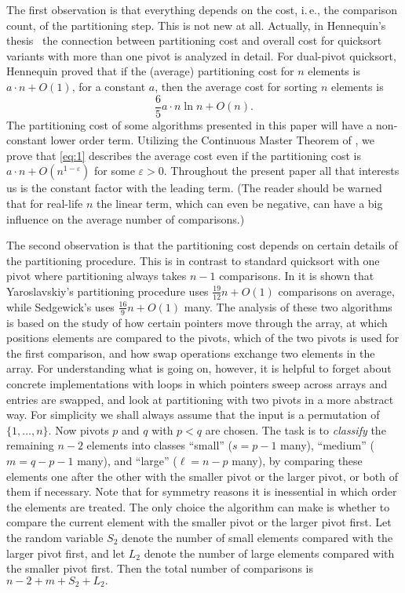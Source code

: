 \documentclass[prodmode,acmtalg]{acmsmall}
\begin{document}
The first observation is that everything depends on the cost, i.\,e., the comparison count, of the partitioning
step.
This is not new at all. Actually, in Hennequin's thesis~\cite{hennequin}
the connection between partitioning cost and overall cost 
for quicksort variants with more than one pivot is analyzed in detail.
For dual-pivot quicksort, Hennequin proved that 
if the (average) partitioning cost for $n$ elements is $a\cdot n+O(1)$, for a constant $a$, then the average cost for sorting $n$ elements is 
\begin{equation}\label{eq:1}
    \frac65a\cdot n\ln n + O(n).
\end{equation}
The partitioning cost of some algorithms presented in this paper will have a non-constant lower order term.
Utilizing the Continuous Master Theorem of \cite{Roura01},
we prove that \eqref{eq:1} describes the average cost even if the partitioning cost is $a \cdot n + O(n^{1-\varepsilon})$ for 
some $\varepsilon > 0$.
Throughout the present paper all that interests us is the constant factor with the leading term.
(The reader should be warned that for real-life $n$ the linear term,
which can even be negative, can have a big influence
on the average number of comparisons.)

The second observation is that the partitioning cost depends on certain details of the 
partitioning procedure. This is in contrast to standard quicksort with one pivot
where partitioning always takes $n-1$ comparisons. In \cite{nebel12} it is shown
that Yaroslavskiy's partitioning procedure uses $\frac{19}{12}n + O(1)$ comparisons on average,
while Sedgewick's uses $\frac{16}{9}n + O(1)$ many. The analysis of these two
algorithms is based on the study of how certain pointers move through the array,
at which positions elements are compared to the pivots, which of the two pivots
is used for the first comparison, and how swap operations
exchange two elements in the array.
For understanding what is going on, however, it is helpful to forget about 
concrete implementations with loops in which pointers sweep across arrays and entries are swapped,
and look at partitioning with two pivots in a more abstract way.
For simplicity we shall always assume that the input is a permutation of $\{1,\ldots,n\}$.
Now pivots $p$ and $q$ with $p<q$ are chosen. 
The task is to \emph{classify} the remaining $n-2$ elements into classes 
``small'' ($s=p-1$ many), ``medium'' ($m=q-p-1$ many), and ``large'' ($\ell=n-p$ many), 
by comparing these elements one after the other with the smaller pivot or
the larger pivot, or both of them if necessary. 
Note that for symmetry reasons it is inessential in which order the elements are treated.
The only choice the algorithm can make is
whether to compare the current element with the smaller pivot or the larger pivot first. 
Let the random variable $S_2$ denote the number of small elements compared with the larger pivot first,
and let $L_2$ denote the number of large elements compared with the smaller pivot first.
Then the total number of comparisons is 
$n-2 + m + S_2 + L_2.$
\end{document}
